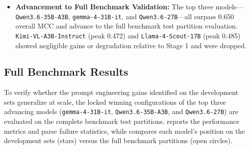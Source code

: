 \begin{itemize}
    \begin{itemize}
        \item In \texttt{gemma-4-31B-it}, only two queries failed to parse (\num{0.0022}\% failure rate), both occurring under the VFX Artist persona due to a disclaimer (\emph{"Unable to determine"}) and an explicit safety refusal (\emph{"My safety guidelines prohibit me from analyzing or identifying individuals in images..."}).
        \item In \texttt{Llama-4-Scout-17B}, the 72 failures (\num{0.0788}\% failure rate) occurred when the model emitted statements such as \emph{"I am unable to verify"} and \emph{"I am not able to complete this task"}.
    \end{itemize}
    \item \textbf{Advancement to Full Benchmark Validation:} The top three models—\texttt{Qwen3.6-35B-A3B}, \texttt{gemma-4-31B-it}, and \texttt{Qwen3.6-27B}—all surpass \num{0.650} overall MCC and advance to the full benchmark test partition evaluation. \texttt{Kimi-VL-A3B-Instruct} (peak \num{0.472}) and \texttt{Llama-4-Scout-17B} (peak \num{0.485}) showed negligible gains or degradation relative to Stage 1 and were dropped.
\end{itemize}

\subsection{Full Benchmark Results}
\label{subsec:stage2_full_validation}

To verify whether the prompt engineering gains identified on the development sets generalize at scale, the locked winning configurations of the top three advancing models (\texttt{gemma-4-31B-it}, \texttt{Qwen3.6-35B-A3B}, and \texttt{Qwen3.6-27B}) are evaluated on the complete benchmark test partitions.  reports the performance metrics and parse failure statistics, while  compares each model's position on the development sets (stars) versus the full benchmark partitions (open circles).

